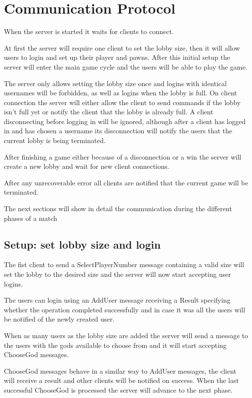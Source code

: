 \documentclass{article}
\begin{document}
\section*{Communication Protocol}
When the server is started it waits for clients to connect.

At first the server will require one client to set the lobby size, then it will allow users to login and set up their player and pawns. After this initial setup the server will enter the main game cycle and the users will be able to play the game.

The server only allows setting the lobby size once and logins with identical usernames will be forbidden, as well as logins when the lobby is full.
On client connection the server will either allow the client to send commands if the lobby isn't full yet or notify the client that the lobby is already full.
A client disconnecting before logging in will be ignored, although after a client has logged in and has chosen a username its disconnection will notify the users that the current lobby is being terminated.

After finishing a game either because of a disconnection or a win the server will create a new lobby and wait for new client connections.

After any unrecoverable error all clients are notified that the current game will be terminated.

\vspace{8pt}

\noindent
The next sections will show in detail the communication during the different phases of a match

\subsection*{Setup: set lobby size and login}
The fist client to send a SelectPlayerNumber message containing a valid size will set the lobby to the desired size and the server will now start accepting user logins.

The users can login using an AddUser message receiving a Result specifying whether the operation completed successfully and in case it was all the users will be notified of the newly created user.

When as many users as the lobby size are added the server will send a message to the users with the gods available to choose from and it will start accepting ChooseGod messages.

ChooseGod messages behave in a similar way to AddUser messages, the client will receive a result and other clients will be notified on success. When the last successful ChooseGod is processed the server will advance to the next phase.
\end{document}
